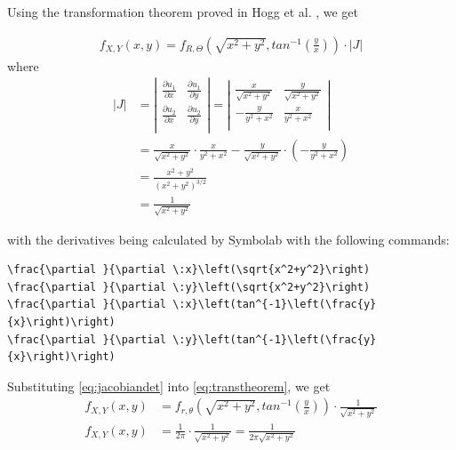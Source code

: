 Using the transformation theorem proved in Hogg et al. \cite[Chapter~2.7]{hogg}, we get
 
\begin{equation}
\begin{split}
f_{X,Y}(x,y) = f_{R,\Theta}\left(\sqrt{x^2+y^2},tan^{-1}\left(\frac{y}{x}\right)\right) \cdot |J|
\end{split}
\label{eq:transtheorem}
\end{equation}
where 
\begin{equation}
\begin{split}
|J| &=
\left|
\begin{matrix}
\frac{\partial u_1}{\partial x} & 
\frac{\partial u_1}{\partial y}  \\[2ex] %
\frac{\partial u_2}{\partial x} & 
\frac{\partial u_2}{\partial y}  \\[2ex]
\end{matrix}
\right|
= 
\left|
\begin{matrix}
\frac{x}{\sqrt{x^2+y^2}}& 
\frac{y}{\sqrt{x^2+y^2}}  \\[2ex] %
-\frac{y}{y^2+x^2} & 
\frac{x}{y^2+x^2}  \\[2ex]
\end{matrix}
\right|\\[2ex]
&= \frac{x}{\sqrt{x^2+y^2}} \cdot \frac{x}{y^2+x^2} -\frac{y}{\sqrt{x^2+y^2}}  \cdot \left(-\frac{y}{y^2+x^2}\right)\\[2ex]
&= \frac{x^2+y^2}{(x^2+y^2)^{3/2}}\\[2ex]
&=\frac{1}{\sqrt{x^2+y^2}}
\end{split}
\label{eq:jacobiandet}
\end{equation}

with the derivatives being calculated by Symbolab \cite{symbolab} with the following commands:
\begin{lstlisting}
\frac{\partial }{\partial \:x}\left(\sqrt{x^2+y^2}\right)
\frac{\partial }{\partial \:y}\left(\sqrt{x^2+y^2}\right)
\frac{\partial }{\partial \:x}\left(tan^{-1}\left(\frac{y}{x}\right)\right)
\frac{\partial }{\partial \:y}\left(tan^{-1}\left(\frac{y}{x}\right)\right)
\end{lstlisting}

Substituting \eqref{eq:jacobiandet} into \eqref{eq:transtheorem}, we get
\begin{equation}
\begin{split}
f_{X,Y}(x,y) &= f_{r,\theta}\left(\sqrt{x^2+y^2},tan^{-1}\left(\frac{y}{x}\right)\right) \cdot \frac{1}{\sqrt{x^2+y^2}}\\[2ex]
f_{X,Y}(x,y) &= \frac{1}{2\pi} \cdot \frac{1}{\sqrt{x^2+y^2}} = \frac{1}{2\pi\sqrt{x^2+y^2}}
\end{split}
\label{eq:transtheoremcomplete}
\end{equation}

